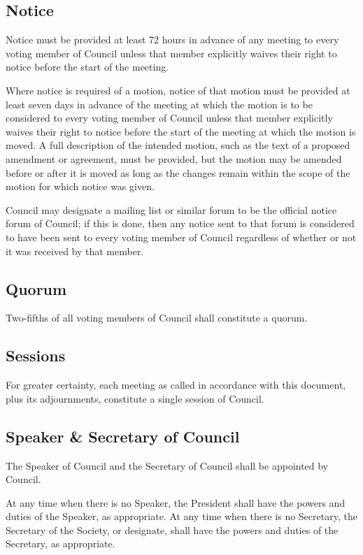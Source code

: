 \subsection{Notice}
Notice must be provided at least 72 hours in advance of any meeting to every
voting member of Council unless that member explicitly waives their
right to notice before the start of the meeting.

Where notice is required of a motion, notice of that motion must be provided at
least seven days in advance of the meeting at which the motion is to be
considered to every voting member of Council unless that member
explicitly waives their right to notice before the start of the meeting at
which the motion is moved. A full description of the intended motion, such as
the text of a proposed amendment or agreement, must be provided, but the motion
may be amended before or after it is moved as long as the changes remain within
the scope of the motion for which notice was given.

Council may designate a mailing list or similar forum to be the
official notice forum of Council; if this is done, then any notice
sent to that forum is considered to have been sent to every voting member of
Council regardless of whether or not it was received by that member.

\subsection{Quorum}
Two-fifths of all voting members of Council shall constitute a
quorum.

\subsection{Sessions}
For greater certainty, each meeting as called in accordance with this document,
plus its adjournments, constitute a single session of Council.

\subsection{Speaker \& Secretary of Council}
The Speaker of Council and the Secretary of Council shall
be appointed by Council. 

At any time when there is no Speaker, the President shall have the powers and
duties of the Speaker, as appropriate.  At any time when there is no Secretary,
the Secretary of the Society, or designate, shall have the powers and duties of the
Secretary, as appropriate.

